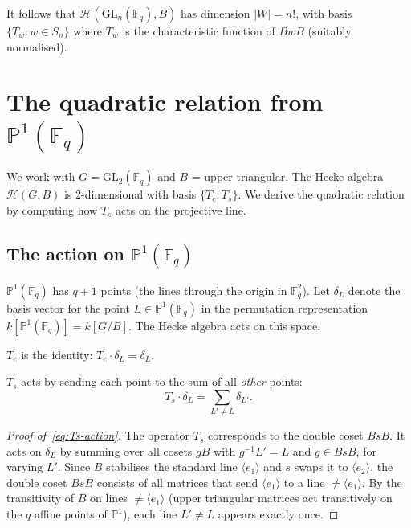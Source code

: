 \documentclass[12pt,a4paper]{article}
\theoremstyle{definition}
\theoremstyle{remark}
\newcommand{\F}{\mathbb{F}}
\newcommand{\GL}{\mathrm{GL}}
\newcommand{\Hecke}{\mathcal{H}}
\newcommand{\PP}{\mathbb{P}}
\begin{document}
It follows that $\Hecke(\GL_n(\F_q), B)$ has dimension
$|W| = n!$, with basis $\{T_w : w \in S_n\}$ where $T_w$ is the
characteristic function of $BwB$ (suitably normalised).

\section{The quadratic relation from $\PP^1(\F_q)$}
\label{sec:quadratic}

We work with $G = \GL_2(\F_q)$ and $B$ = upper triangular. The Hecke
algebra $\Hecke(G, B)$ is $2$-dimensional with basis $\{T_e, T_s\}$.
We derive the quadratic relation by computing how $T_s$ acts on the
projective line.

\subsection{The action on $\PP^1(\F_q)$}

$\PP^1(\F_q)$ has $q + 1$ points (the lines through the origin in
$\F_q^2$). Let $\delta_L$ denote the basis vector for the point
$L \in \PP^1(\F_q)$ in the permutation representation
$k[\PP^1(\F_q)] = k[G/B]$. The Hecke algebra acts on this space.

\medskip\noindent\textbf{$T_e$} is the identity: $T_e \cdot \delta_L
= \delta_L$.

\medskip\noindent\textbf{$T_s$} acts by sending each point to the sum
of all \emph{other} points:
\begin{equation}\label{eq:Ts-action}
  T_s \cdot \delta_L = \sum_{L' \neq L} \delta_{L'}.
\end{equation}

\begin{proof}[Proof of~\eqref{eq:Ts-action}]
The operator $T_s$ corresponds to the double coset $BsB$. It acts on
$\delta_L$ by summing over all cosets $gB$ with $g^{-1}L' = L$ and
$g \in BsB$, for varying $L'$. Since $B$ stabilises the standard
line $\langle e_1 \rangle$ and $s$ swaps it to $\langle e_2 \rangle$,
the double coset $BsB$ consists of all matrices that send
$\langle e_1 \rangle$ to a line $\neq \langle e_1 \rangle$. By the
transitivity of $B$ on lines $\neq \langle e_1 \rangle$ (upper
triangular matrices act transitively on the $q$ affine points of
$\PP^1$), each line $L' \neq L$ appears exactly once.
\end{proof}
\end{document}
